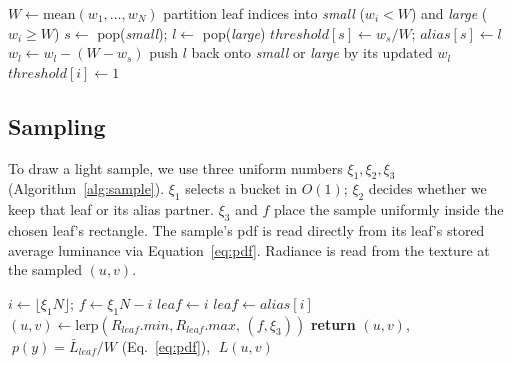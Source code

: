 \documentclass[acmtog,review]{acmart}
\begin{document}
\begin{algorithm}[h]
\caption{Build the alias table over $N$ leaves}
\label{alg:build}
\begin{algorithmic}[1]
\STATE $W \leftarrow \text{mean}(w_1,\dots,w_N)$
\STATE partition leaf indices into \textit{small} ($w_i < W$) and \textit{large} ($w_i \geq W$)
  \STATE $s \leftarrow$ pop(\textit{small}); \quad $l \leftarrow$ pop(\textit{large})
  \STATE $\mathit{threshold}[s] \leftarrow w_s / W$; \quad $\mathit{alias}[s] \leftarrow l$
  \STATE $w_l \leftarrow w_l - (W - w_s)$ 
  \STATE push $l$ back onto \textit{small} or \textit{large} by its updated $w_l$
\ENDWHILE
{}
  \STATE $\mathit{threshold}[i] \leftarrow 1$
\ENDFOR
\end{algorithmic}
\end{algorithm}

\subsection{Sampling}
\label{sec:sampling}
To draw a light sample, we use three uniform numbers $\xi_1,\xi_2,\xi_3$
(Algorithm~\ref{alg:sample}). $\xi_1$ selects a bucket in $O(1)$;
$\xi_2$ decides whether we keep that leaf or its
alias partner.
$\xi_3$ and $f$ place the sample uniformly
inside the chosen leaf's rectangle. The sample's pdf is read directly from its
leaf's stored average luminance via Equation~\ref{eq:pdf}. Radiance is read from the texture at the sampled $(u,v)$.

\begin{algorithm}[h]
\caption{Draw one light sample}
\label{alg:sample}
\begin{algorithmic}[1]
\STATE $i \leftarrow \lfloor \xi_1 N \rfloor$; \quad $f \leftarrow \xi_1 N - i$
  \STATE $\mathit{leaf} \leftarrow i$
\ELSE
  \STATE $\mathit{leaf} \leftarrow \mathit{alias}[i]$
\ENDIF
\STATE $(u,v) \leftarrow \text{lerp}(R_{\mathit{leaf}}.\mathit{min}, R_{\mathit{leaf}}.\mathit{max},\, (f,\xi_3))$
\STATE \textbf{return} $(u,v)$, $\;p(y){=}\bar{L}_{\mathit{leaf}}/W$ (Eq.~\ref{eq:pdf}), $\;L(u,v)$
\end{algorithmic}
\end{algorithm}
\end{document}
